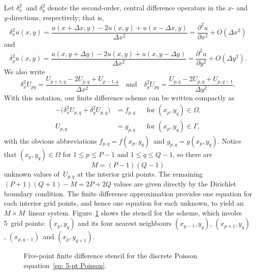 Let $\delta_x^2$~and $\delta_y^2$ denote the second-order, central difference 
operators in the $x$- and $y$-directions, respectively; that is,
\[
\delta_x^2u(x,y)=\frac{u(x+\Delta x,y)-2u(x,y)+u(x-\Delta x,y)}{\Delta x^2}
    =\frac{\partial^2u}{\partial x^2}+O(\Delta x^2)
\]
and
\[
\delta_y^2u(x,y)=\frac{u(x,y+\Delta y)-2u(x,y)+u(x,y-\Delta y)}{\Delta x^2}
    =\frac{\partial^2u}{\partial y^2}+O(\Delta y^2).
\]
We also write
\[
\delta_x^2U_{pq}=\frac{U_{p+1,q}-2U_{p,q}+U_{p-1,q}}{\Delta x^2}
\quad\text{and}\quad
\delta_y^2U_{pq}=\frac{U_{p,q}-2U_{p,q}+U_{p,q-1}}{\Delta y^2}.
\]
With this notation, our finite difference scheme can be written compactly as
\begin{equation}\label{eq: 5-pt Poisson}
\begin{aligned}
-\bigl(\delta_x^2U_{p,q}+\delta_y^2U_{p,q}\bigr)&=f_{p,q}
    &&\text{for $(x_p,y_q)\in\Omega$,}\\
U_{p,q}&=g_{p,q}&&\text{for $(x_p,y_q)\in\Gamma$,}
\end{aligned}
\end{equation}
with the obvious abbreviations $f_{p,q}=f(x_p,y_q)$~and $g_{p,q}=g(x_p,y_q)$.
Notice that $(x_p,y_q)\in\Omega$ for $1\le p\le P-1$ and $1\le q\le Q-1$, so 
there are 
\[
M=(P-1)(Q-1)
\]
unknown values of~$U_{p,q}$ at the interior grid points.  The remaining
$(P+1)(Q+1)-M=2P+2Q$ values are given directly by the Dirichlet boundary 
condition.  The finite difference approximation provides one equation for 
each interior grid points, and hence one equation for each unknown, to yield an 
$M\times M$~linear system.  Figure~\ref{fig: 5-pt stencil} shows the stencil 
for the scheme, which involes 5~grid points: $(x_p,y_q)$ and its four nearest 
neighbours $(x_{p-1},y_q)$, $(x_{p+1},y_q)$, $(x_{p,q-1})$~and 
$(x_p,y_{q+1})$.

\begin{figure}
\caption{Five-point finite difference stencil for the discrete Poisson 
equation~\eqref{eq: 5-pt Poisson}.}\label{fig: 5-pt stencil}
\begin{center}
\end{center}
\end{figure}

